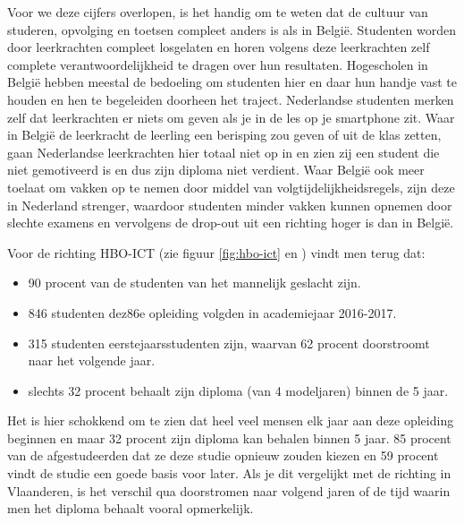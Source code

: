 Voor we deze cijfers overlopen, is het handig om te weten dat de cultuur van studeren, opvolging en toetsen compleet anders is als in België. Studenten worden door leerkrachten compleet losgelaten en horen volgens deze leerkrachten zelf complete verantwoordelijkheid te dragen over hun resultaten. Hogescholen in België hebben meestal de bedoeling om studenten hier en daar hun handje vast te houden en hen te begeleiden doorheen het traject. Nederlandse studenten merken zelf dat leerkrachten er niets om geven als je in de les op je smartphone zit. Waar in België de leerkracht de leerling een berisping zou geven of uit de klas zetten, gaan Nederlandse leerkrachten hier totaal niet op in en zien zij een student die niet gemotiveerd is en dus zijn diploma niet verdient. Waar België ook meer toelaat om vakken op te nemen door middel van volgtijdelijkheidsregels, zijn deze in Nederland strenger, waardoor studenten minder vakken kunnen opnemen door slechte examens en vervolgens de drop-out uit een richting hoger is dan in België.

Voor de richting HBO-ICT (zie figuur \ref{fig:hbo-ict} en \textcite{Studiekeuze2017}) vindt men terug dat:
\begin{itemize}
	\item 90 procent van de studenten van het mannelijk geslacht zijn.
	\item 846 studenten dez86e opleiding volgden in academiejaar 2016-2017.
	\item 315 studenten eerstejaarsstudenten zijn, waarvan 62 procent doorstroomt naar het volgende jaar.
	\item slechts 32 procent behaalt zijn diploma (van 4 modeljaren) binnen de 5 jaar.
\end{itemize}

Het is hier schokkend om te zien dat heel veel mensen elk jaar aan deze opleiding beginnen en maar 32 procent zijn diploma kan behalen binnen 5 jaar. 85 procent van de afgestudeerden dat ze deze studie opnieuw zouden kiezen en 59 procent vindt de studie een goede basis voor later. Als je dit vergelijkt met de richting in Vlaanderen, is het verschil qua doorstromen naar volgend jaren of de tijd waarin men het diploma behaalt vooral opmerkelijk.

